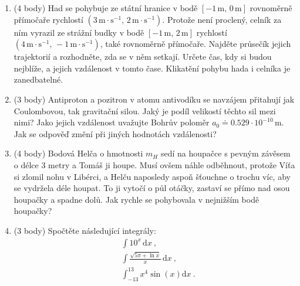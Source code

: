 \documentclass[12pt,a4paper]{article}
\begin{document}
\begin{enumerate}[resume,label=\arabic*)]
\item (4 body)
Had se pohybuje ze státní hranice v bodě $\left[-1\,\mathrm{m},\, 0\,\mathrm{m}\right]$ rovnoměrně přímočaře rychlostí $\left(3\,\mathrm{m}\cdot\mathrm{s}^{-1},\, 2\,\mathrm{m}\cdot\mathrm{s}^{-1}\right)$. Protože není proclený, celník za ním vyrazil ze strážní budky v bodě $\left[-1\,\mathrm{m},\, 2\,\mathrm{m}\right]$ rychlostí $\left(4\,\mathrm{m}\cdot\mathrm{s}^{-1},\, -1\,\mathrm{m}\cdot\mathrm{s}^{-1}\right)$, také rovnoměrně přímočaře. Najděte průsečík jejich trajektorií a rozhodněte, zda se v něm setkají. Určete čas, kdy si budou nejblíže, a jejich vzdálenost v tomto čase. Klikatění pohybu hada i celníka je zanedbatelné.

\item (3 body) Antiproton a pozitron v atomu antivodíku se navzájem přitahují jak Coulombovou, tak gravitační silou. Jaký je podíl velikostí těchto sil mezi nimi? Jako jejich vzdálenost uvažujte Bohrův poloměr $a_0 \doteq 0.529\cdot 10^{-10}\,\mathrm{m}$. Jak se odpověď změní při jiných hodnotách vzdálenosti?

\item (4 body) Bodová Helča o hmotnosti $m_H$ sedí na houpačce s pevným závěsem o délce 3 metry a Tomáš ji houpe. Musí ovšem náhle odběhnout, protože Víťa si zlomil nohu v Libérci, a Helču naposledy aspoň šťouchne o trochu víc, aby se vydržela déle houpat. To ji vytočí o půl otáčky, zastaví se přímo nad osou houpačky a spadne dolů. Jak rychle se pohybovala v nejnižším bodě houpačky?

\item (3 body) Spočtěte následující integrály:
\begin{align*}
    &\int 10^x \,\mathrm{d}x ~,\\
    &\int \frac{\sqrt{5\pi + \ln x}}{x} \,\mathrm{d}x ~,\\
    &\int_{-13}^{13} x^4\sin\left(x\right)\mathrm{d}x ~.
\end{align*}

\end{enumerate}
\end{document}
